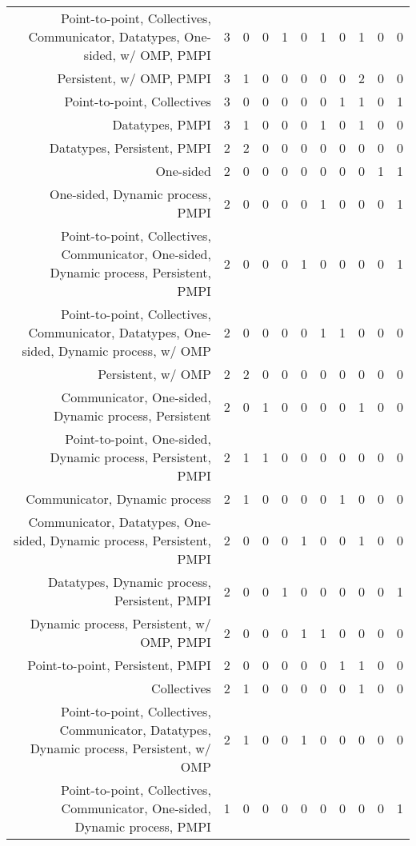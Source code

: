 {\begin{landscape}
\begin{longtable}[htb]{r|c|c|c|c|c|c|c|c|c|c}
{Point-to-point, Collectives, Communicator, Datatypes, One-sided, w/ OMP, PMPI} & 3 & 0 & 0 & 1 & 0 & 1 & 0 & 1 & 0 & 0 \\%
{Persistent, w/ OMP, PMPI} & 3 & 1 & 0 & 0 & 0 & 0 & 0 & 2 & 0 & 0 \\%
{Point-to-point, Collectives} & 3 & 0 & 0 & 0 & 0 & 0 & 1 & 1 & 0 & 1 \\%
{Datatypes, PMPI} & 3 & 1 & 0 & 0 & 0 & 1 & 0 & 1 & 0 & 0 \\%
{Datatypes, Persistent, PMPI} & 2 & 2 & 0 & 0 & 0 & 0 & 0 & 0 & 0 & 0 \\%
{One-sided} & 2 & 0 & 0 & 0 & 0 & 0 & 0 & 0 & 1 & 1 \\%
{One-sided, Dynamic process, PMPI} & 2 & 0 & 0 & 0 & 0 & 1 & 0 & 0 & 0 & 1 \\%
{Point-to-point, Collectives, Communicator, One-sided, Dynamic process, Persistent, PMPI} & 2 & 0 & 0 & 0 & 1 & 0 & 0 & 0 & 0 & 1 \\%
{Point-to-point, Collectives, Communicator, Datatypes, One-sided, Dynamic process, w/ OMP} & 2 & 0 & 0 & 0 & 0 & 1 & 1 & 0 & 0 & 0 \\%
{Persistent, w/ OMP} & 2 & 2 & 0 & 0 & 0 & 0 & 0 & 0 & 0 & 0 \\%
{Communicator, One-sided, Dynamic process, Persistent} & 2 & 0 & 1 & 0 & 0 & 0 & 0 & 1 & 0 & 0 \\%
{Point-to-point, One-sided, Dynamic process, Persistent, PMPI} & 2 & 1 & 1 & 0 & 0 & 0 & 0 & 0 & 0 & 0 \\%
{Communicator, Dynamic process} & 2 & 1 & 0 & 0 & 0 & 0 & 1 & 0 & 0 & 0 \\%
{Communicator, Datatypes, One-sided, Dynamic process, Persistent, PMPI} & 2 & 0 & 0 & 0 & 1 & 0 & 0 & 1 & 0 & 0 \\%
{Datatypes, Dynamic process, Persistent, PMPI} & 2 & 0 & 0 & 1 & 0 & 0 & 0 & 0 & 0 & 1 \\%
{Dynamic process, Persistent, w/ OMP, PMPI} & 2 & 0 & 0 & 0 & 1 & 1 & 0 & 0 & 0 & 0 \\%
{Point-to-point, Persistent, PMPI} & 2 & 0 & 0 & 0 & 0 & 0 & 1 & 1 & 0 & 0 \\%
{Collectives} & 2 & 1 & 0 & 0 & 0 & 0 & 0 & 1 & 0 & 0 \\%
{Point-to-point, Collectives, Communicator, Datatypes, Dynamic process, Persistent, w/ OMP} & 2 & 1 & 0 & 0 & 1 & 0 & 0 & 0 & 0 & 0 \\%
{Point-to-point, Collectives, Communicator, One-sided, Dynamic process, PMPI} & 1 & 0 & 0 & 0 & 0 & 0 & 0 & 0 & 0 & 1 \\%

\end{longtable}
\end{landscape}}
